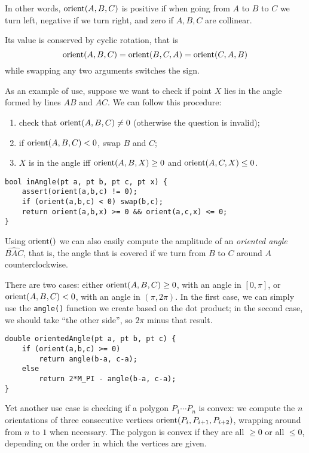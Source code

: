 In other words, $\operatorname{orient}(A,B,C)$ is positive if when going from $A$ to $B$ to $C$ we turn left, negative if we turn right, and zero if $A,B,C$ are collinear.


Its value is conserved by cyclic rotation, that is \[\operatorname{orient}(A,B,C) = \operatorname{orient}(B,C,A) = \operatorname{orient}(C,A,B)\] while swapping any two arguments switches the sign.

As an example of use, suppose we want to check if point $X$ lies in the angle formed by lines $AB$ and $AC$. We can follow this procedure:
\begin{enumerate}
\item check that $\operatorname{orient}(A,B,C) \neq 0$ (otherwise the question is invalid);
\item if $\operatorname{orient}(A,B,C) < 0$, swap $B$ and $C$;
\item $X$ is in the angle iff $\operatorname{orient}(A,B,X) \geq 0$ and $\operatorname{orient}(A,C,X) \leq 0$.
\end{enumerate}
\begin{lstlisting}
bool inAngle(pt a, pt b, pt c, pt x) {
    assert(orient(a,b,c) != 0);
    if (orient(a,b,c) < 0) swap(b,c);
    return orient(a,b,x) >= 0 && orient(a,c,x) <= 0;
}
\end{lstlisting}

Using $\operatorname{orient}()$ we can also easily compute the amplitude of an \emph{oriented angle} $\widehat{BAC}$, that is, the angle that is covered if we turn from $B$ to $C$ around $A$ counterclockwise.

There are two cases: either $\operatorname{orient}(A,B,C) \geq 0$, with an angle in $[0,\pi]$, or $\operatorname{orient}(A,B,C) < 0$, with an angle in $(\pi,2\pi)$. In the first case, we can simply use the \lstinline|angle()| function we create based on the dot product; in the second case, we should take ``the other side'', so $2\pi$ minus that result.


\begin{lstlisting}
double orientedAngle(pt a, pt b, pt c) {
    if (orient(a,b,c) >= 0)
        return angle(b-a, c-a);
    else
        return 2*M_PI - angle(b-a, c-a);
}
\end{lstlisting}

Yet another use case is checking if a polygon $P_1\cdots P_n$ is convex: we compute the $n$ orientations of three consecutive vertices $\operatorname{orient}(P_i,P_{i+1},P_{i+2})$, wrapping around from $n$ to $1$ when necessary. The polygon is convex if they are all $\geq 0$ or all $\leq 0$, depending on the order in which the vertices are given.

